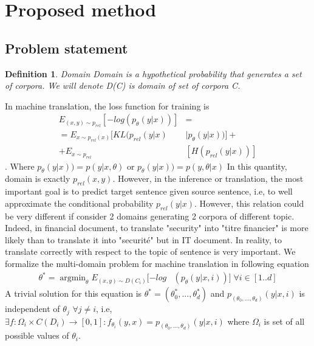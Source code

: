 \documentclass[11pt,a4paper]{article}
\newtheorem{definition}{Definition}[section]
\DeclareMathOperator*{\argmin}{argmin}
\begin{document}
\section{Proposed method}
\subsection{Problem statement}
\begin{definition}{Domain}
\label{def:1}
Domain is a hypothetical probability that generates a set of corpora. We will denote D(C) is domain of set of corpora C.
\end{definition}

In machine translation, the loss function for training is
\begin{equation}
\begin{split}
E_{(x,y) \sim p_{rel}}[-log(p_{\theta}(y|x))] &= \\
= E_{x \sim p_{rel}(x)}[KL(p_{rel}(y|x) & \mid p_{\theta}(y|x))] + \\
+ E_{x \sim p_{rel}} &[H(p_{rel}(y|x))]
\end{split}
\end{equation}.
Where $p_{\theta}(y|x)) = p(y|x,\theta)$ or $p_{\theta}(y|x)) = p(y,\theta | x)$
 In this quantity, domain is exactly $p_{rel}(x,y)$. However, in the inference or translation, the most important goal is to predict target sentence given source sentence, i.e, to well approximate the conditional probability $p_{rel}(y|x)$. However, this relation could be very different if consider 2 domains generating 2 corpora of different topic. Indeed, in financial document, to translate "security" into "titre financier" is more likely than to translate it into "securit\'e" but in IT document. In reality, to translate correctly with respect to the topic of sentence is very important. We formalize the multi-domain problem for machine translation in following equation
\begin{equation}
\begin{split}
\theta^* = \argmin_{\theta} E_{(x,y) \sim D(C_{i})} [-log & (p_{\theta}(y|x,i))] \; \forall i \in [1..d]
\end{split}
\end{equation}
A trivial solution for this equation is $\theta^* = (\theta^*_{0},...,\theta^*_{d})$ and $p_{(\theta_{0},...,\theta_d)}(y|x,i)$ is independent of $\theta_{j}$ $\forall j \neq i$, i.e, $\exists f:\Omega_i \times C(D_i) \rightarrow [0,1]: f_{\theta_i}(y,x) = p_{(\theta_{0},...,\theta_d)}(y|x,i)$ where $\Omega_i$ is set of all possible values of $\theta_i$. \\
\end{document}
